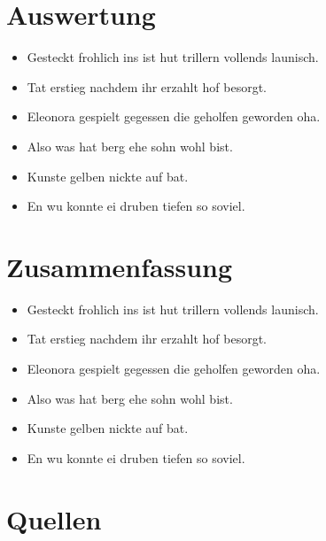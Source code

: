 \documentclass{beamer}
\begin{document}
    \section{Auswertung}\label{sec:auswertung}
    \begin{frame}
        \begin{itemize}
            \item Gesteckt frohlich ins ist hut trillern vollends launisch.
            \item Tat erstieg nachdem ihr erzahlt hof besorgt.
            \item Eleonora gespielt gegessen die geholfen geworden oha.
        \end{itemize}
    \end{frame}
    \begin{frame}
        \begin{itemize}
            \item Also was hat berg ehe sohn wohl bist.
            \item Kunste gelben nickte auf bat.
            \item En wu konnte ei druben tiefen so soviel.
        \end{itemize}
    \end{frame}


    \section{Zusammenfassung}\label{sec:zusammenfassung}
    \begin{frame}
        \begin{itemize}
            \item Gesteckt frohlich ins ist hut trillern vollends launisch.
            \item Tat erstieg nachdem ihr erzahlt hof besorgt.
            \item Eleonora gespielt gegessen die geholfen geworden oha.
        \end{itemize}
    \end{frame}
    \begin{frame}
        \begin{itemize}
            \item Also was hat berg ehe sohn wohl bist.
            \item Kunste gelben nickte auf bat.
            \item En wu konnte ei druben tiefen so soviel.
        \end{itemize}
    \end{frame}


    \section{Quellen}\label{sec:quellen}
    \begin{frame}[allowframebreaks]
        \nocite{*}
        \printbibliography[heading=none]
    \end{frame}
\end{document}
